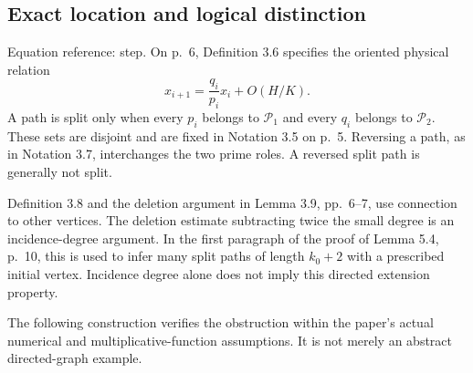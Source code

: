 \documentclass[10pt]{article}
\begin{document}
\subsection*{Exact location and logical distinction}
Equation reference: step. On p. 6, Definition 3.6 specifies the oriented physical relation \[
 x_{i+1}=\frac{q_i}{p_i}x_i+O(H/K).\] A path is split only when every \(p_i\) belongs to \(\mathcal P_1\) and every \(q_i\) belongs to \(\mathcal P_2\). These sets are disjoint and are fixed in Notation 3.5 on p. 5. Reversing a path, as in Notation 3.7, interchanges the two prime roles. A reversed split path is generally not split.\par
Definition 3.8 and the deletion argument in Lemma 3.9, pp. 6–7, use connection to other vertices. The deletion estimate subtracting twice the small degree is an incidence-degree argument. In the first paragraph of the proof of Lemma 5.4, p. 10, this is used to infer many split paths of length \(k_0+2\) with a prescribed initial vertex. Incidence degree alone does not imply this directed extension property.\par
The following construction verifies the obstruction within the paper’s actual numerical and multiplicative-function assumptions. It is not merely an abstract directed-graph example.\par
\end{document}
